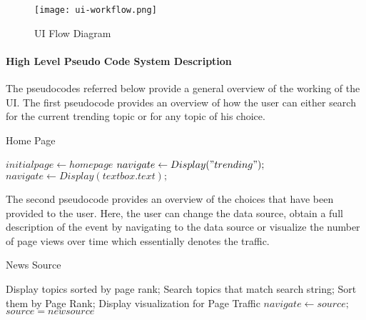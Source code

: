 \begin{figure}[!ht]
  \centering
  \texttt{[image: ui-workflow.png]}
  \caption{UI Flow Diagram}
  \label{fig:ui-workflow}
\end{figure}

\paragraph{High Level Pseudo Code System Description}\mbox
The pseudocodes referred below provide a general overview of the working of the UI. The first pseudocode provides an overview of how the user can either search for the current trending topic or for any topic of his choice.
\begin{algorithm}[!ht]
\caption{Home Page}\label{alg:Home Page}
\begin{algorithmic}[1]

\State $initialpage\gets homepage$
       \State $navigate\gets Display("trending");$
       \State $navigate\gets Display(textbox.text);$
    \EndIf
\EndProcedure
\end{algorithmic}
\end{algorithm}
 The second pseudocode provides an overview of the choices that have been provided to the user. Here, the user can change the data source, obtain a full description of the event by navigating to the data source or visualize the number of page views over time which essentially denotes the traffic.
\begin{algorithm}[!ht]
\caption{News Source }\label{alg:News Source}
\begin{algorithmic}[1]
       \State Display topics sorted by page rank;
       \Else
       \State Search topics that match search string;
       \State Sort them by Page Rank;
    \EndIf
{}
       \State Display visualization for Page Traffic 
       \State $navigate\gets source;$
       \State $source = newsource$ 

    \EndIf
\EndProcedure
\end{algorithmic}
\end{algorithm}



